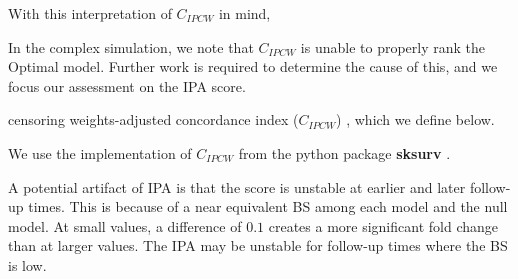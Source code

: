 With this interpretation of \(C_{IPCW}\) in mind,


In the complex simulation, we note that \(C_{IPCW}\) is unable to properly rank the Optimal model.
Further work is required to determine the cause of this, and we focus our assessment on the IPA score.


censoring weights-adjusted concordance index (\(C_{IPCW}\))
\citep{uno2011}, which we define below. 

We use the implementation of \(C_{IPCW}\) from the python
package \textbf{sksurv} \citep{sksurv}.



A potential artifact of IPA is that the score is unstable at earlier and
later follow-up times. This is because of a near equivalent BS
among each model and the null model. At small values, a difference of
\(0.1\) creates a more significant fold change than at larger values. The IPA may
be unstable for follow-up times where the BS is low.


